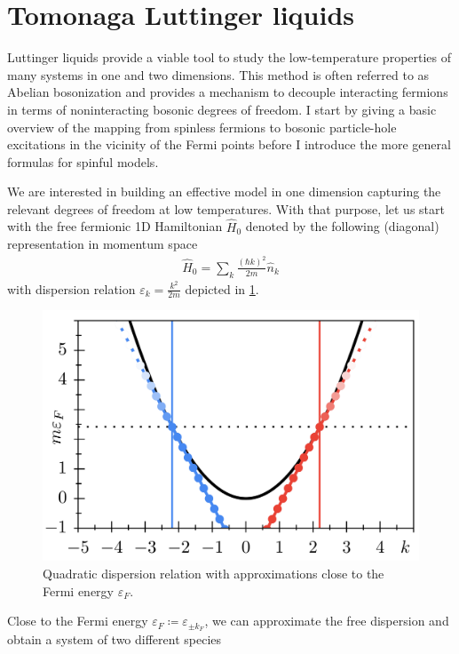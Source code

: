\section{Tomonaga Luttinger liquids}
\label{sec:tomonaga_LL}
Luttinger liquids provide a viable tool to study the low-temperature properties of many systems in one and two dimensions.
This method is often referred to as Abelian bosonization and provides a mechanism to decouple interacting fermions in terms of noninteracting bosonic degrees of freedom.
I start by giving a basic overview of the mapping from spinless fermions to bosonic particle-hole excitations in the vicinity of the Fermi points before I introduce the more general formulas for spinful models.

We are interested in building an effective model in one dimension capturing the relevant degrees of freedom at low temperatures.
With that purpose, let us start with the free fermionic 1D Hamiltonian $\hat H_0$ denoted by the following (diagonal) representation in momentum space
\begin{align}
    \hat H_0 = \sum_k \frac{(\hbar k)^2}{2m}\hat n_k
    \label{eq:hamiltonian_free_particles}
\end{align}
with dispersion relation $\varepsilon_k =\frac{k^2}{2m}$ depicted in \cref{fig:1D_quadratic_dispersion}.
\begin{figure}
    \centering
    \includegraphics{figures/1D_quadratic_dispersion.png}
    \caption{Quadratic dispersion relation with approximations close to the Fermi energy $\varepsilon_F$.}
    \label{fig:1D_quadratic_dispersion}
\end{figure}
Close to the Fermi energy $\varepsilon_F\coloneqq\varepsilon_{\pm k_F}$, we can approximate the free dispersion and obtain a system of two different species

